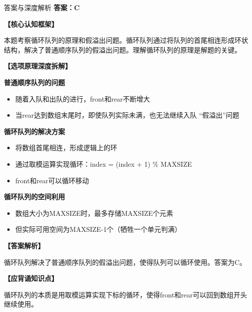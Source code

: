 \documentclass[12pt, a4paper]{article}
\newenvironment{bluebox}{\begin{framed}\begin{minipage}{\linewidth}}{\end{minipage}\end{framed}}
\begin{document}
\begin{bluebox}{答案与深度解析}
	\textbf{答案：C}

	\textbf{【核心认知框架】}

	本题考察循环队列的原理和假溢出问题。循环队列通过将队列的首尾相连形成环状结构，解决了普通顺序队列的假溢出问题。理解循环队列的原理是解题的关键。

	\textbf{【选项原理深度拆解】}

	\item \textbf{普通顺序队列的问题}
	\begin{itemize}
		\item 随着入队和出队的进行，front和rear不断增大
		\item 当rear达到数组末尾时，即使队列实际未满，也无法继续入队
		      “假溢出”问题
	\end{itemize}

	\item \textbf{循环队列的解决方案}
	\begin{itemize}
		\item 将数组首尾相连，形成逻辑上的环
		\item 通过取模运算实现循环：index = (index + 1) \% MAXSIZE
		\item front和rear可以循环移动
	\end{itemize}

	\item \textbf{循环队列的空间利用}
	\begin{itemize}
		\item 数组大小为MAXSIZE时，最多存储MAXSIZE个元素
		\item 但实际可用空间为MAXSIZE-1个（牺牲一个单元判满）
	\end{itemize}

	\textbf{【答案解析】}

	循环队列解决了普通顺序队列的假溢出问题，使得队列可以循环使用。答案为C。

	\textbf{【应背诵知识点】}

	循环队列的本质是用取模运算实现下标的循环，使得front和rear可以回到数组开头继续使用。
\end{bluebox}
\end{document}
